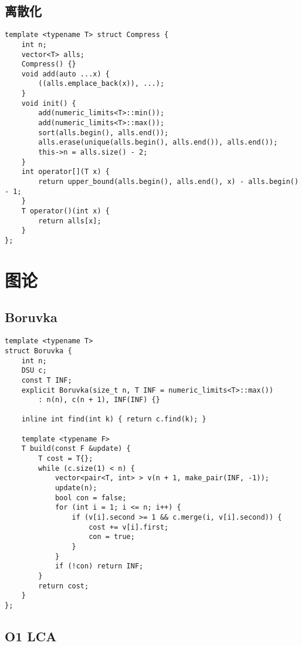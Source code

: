 \documentclass[a4paper,10pt]{article}
\begin{document}
\subsection{离散化}
\thispagestyle{fancy}

\noindent\begin{lstlisting}
template <typename T> struct Compress {
    int n;
    vector<T> alls;
    Compress() {}
    void add(auto ...x) {
        ((alls.emplace_back(x)), ...);
    }
    void init() {
        add(numeric_limits<T>::min());
        add(numeric_limits<T>::max());
        sort(alls.begin(), alls.end());
        alls.erase(unique(alls.begin(), alls.end()), alls.end());
        this->n = alls.size() - 2;
    }
    int operator[](T x) {
        return upper_bound(alls.begin(), alls.end(), x) - alls.begin() - 1;
    }
    T operator()(int x) {
        return alls[x];
    }
};\end{lstlisting}

\section{图论}
\thispagestyle{fancy}

\subsection{Boruvka}
\thispagestyle{fancy}

\noindent\begin{lstlisting}
template <typename T>
struct Boruvka {
    int n;
    DSU c;
    const T INF;
    explicit Boruvka(size_t n, T INF = numeric_limits<T>::max())
        : n(n), c(n + 1), INF(INF) {}

    inline int find(int k) { return c.find(k); }

    template <typename F>
    T build(const F &update) {
        T cost = T{};
        while (c.size(1) < n) {
            vector<pair<T, int> > v(n + 1, make_pair(INF, -1));
            update(n);
            bool con = false;
            for (int i = 1; i <= n; i++) {
                if (v[i].second >= 1 && c.merge(i, v[i].second)) {
                    cost += v[i].first;
                    con = true;
                }
            }
            if (!con) return INF;
        }
        return cost;
    }
};\end{lstlisting}

\subsection{O1 LCA}
\thispagestyle{fancy}
\end{document}
